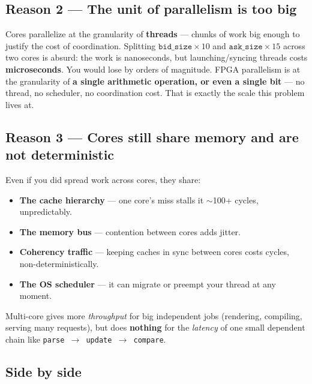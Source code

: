 \documentclass[11pt,a4paper]{article}
\begin{document}
\subsection*{Reason 2 --- The unit of parallelism is too big}

Cores parallelize at the granularity of \textbf{threads} --- chunks of work big enough to
justify the cost of coordination. Splitting $\texttt{bid\_size}\times 10$ and
$\texttt{ask\_size}\times 15$ across two cores is absurd: the work is nanoseconds, but
launching/syncing threads costs \textbf{microseconds}. You would lose by orders of
magnitude. FPGA parallelism is at the granularity of \textbf{a single arithmetic
operation, or even a single bit} --- no thread, no scheduler, no coordination cost. That
is exactly the scale this problem lives at.

\subsection*{Reason 3 --- Cores still share memory and are not deterministic}

Even if you did spread work across cores, they share:
\begin{itemize}[leftmargin=1.4em, itemsep=2pt]
  \item \textbf{The cache hierarchy} --- one core's miss stalls it $\sim$100+ cycles, unpredictably.
  \item \textbf{The memory bus} --- contention between cores adds jitter.
  \item \textbf{Coherency traffic} --- keeping caches in sync between cores costs cycles, non-deterministically.
  \item \textbf{The OS scheduler} --- it can migrate or preempt your thread at any moment.
\end{itemize}
Multi-core gives more \emph{throughput} for big independent jobs (rendering, compiling,
serving many requests), but does \textbf{nothing} for the \emph{latency} of one small
dependent chain like \texttt{parse $\rightarrow$ update $\rightarrow$ compare}.

\subsection*{Side by side}
\end{document}
